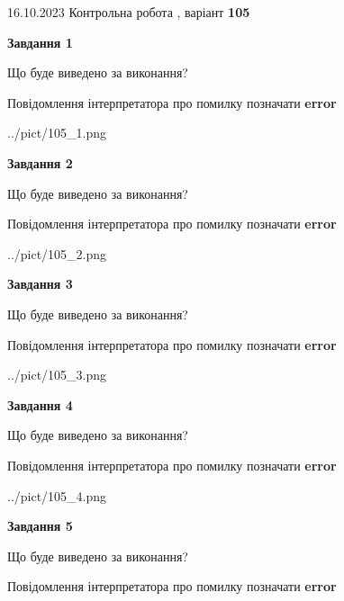 \documentclass[12pt, ukrainian]{article}
\begin{document}
{\Large{16.10.2023 Контрольна робота , варіант  \No \textbf { 105 }\par}}
{
\begin {large}
{\begin {center}\textbf{Завдання 1}\end {center}}\par
Що буде виведено за виконання? \par
Повідомлення інтерпретатора про помилку позначати \textbf{error}

\begin{center}
	{../pict/105_1.png}
\end{center}
\newpage

{\begin {center}\textbf{Завдання 2}\end {center}}\par
Що буде виведено за виконання? \par
Повідомлення інтерпретатора про помилку позначати \textbf{error}

\begin{center}
	{../pict/105_2.png}
\end{center}
\newpage

{\begin {center}\textbf{Завдання 3}\end {center}}\par
Що буде виведено за виконання? \par
Повідомлення інтерпретатора про помилку позначати \textbf{error}

\begin{center}
	{../pict/105_3.png}
\end{center}
\newpage

{\begin {center}\textbf{Завдання 4}\end {center}}\par
Що буде виведено за виконання? \par
Повідомлення інтерпретатора про помилку позначати \textbf{error}

\begin{center}
	{../pict/105_4.png}
\end{center}
\newpage

{\begin {center}\textbf{Завдання 5}\end {center}}\par
Що буде виведено за виконання? \par
Повідомлення інтерпретатора про помилку позначати \textbf{error}


\end{large}}
\end{document}
